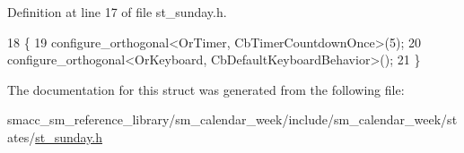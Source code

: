 Definition at line 17 of file st\+\_\+sunday.\+h.


\begin{DoxyCode}
18     \{
19         configure\_orthogonal<OrTimer,  CbTimerCountdownOnce>(5);   
20         configure\_orthogonal<OrKeyboard, CbDefaultKeyboardBehavior>();
21     \}
\end{DoxyCode}


The documentation for this struct was generated from the following file\+:\begin{DoxyCompactItemize}
\item 
smacc\+\_\+sm\+\_\+reference\+\_\+library/sm\+\_\+calendar\+\_\+week/include/sm\+\_\+calendar\+\_\+week/states/\hyperlink{sm__calendar__week_2include_2sm__calendar__week_2states_2st__sunday_8h}{st\+\_\+sunday.\+h}\end{DoxyCompactItemize}
